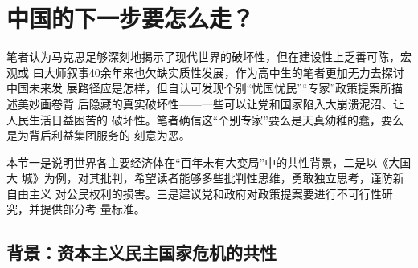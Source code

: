 \chapter{中国的下一步要怎么走？}


笔者认为马克思足够深刻地揭示了现代世界的破坏性，但在建设性上乏善可陈，宏观或
曰大师叙事40余年来也欠缺实质性发展，作为高中生的笔者更加无力去探讨中国未来发
展路径应是怎样，但自认可发现个别“忧国忧民”“专家”政策提案所描述美妙画卷背
后隐藏的真实破坏性——一些可以让党和国家陷入大崩溃泥沼、让人民生活日益困苦的
破坏性。笔者确信这“个别专家”要么是天真幼稚的蠢，要么是为背后利益集团服务的
刻意为恶。

本节一是说明世界各主要经济体在“百年未有大变局”中的共性背景，二是以《大国大
城》为例，对其批判，希望读者能够多些批判性思维，勇敢独立思考，谨防新自由主义
对公民权利的损害。三是建议党和政府对政策提案要进行不可行性研究，并提供部分考
量标准。


\section{背景：资本主义民主国家危机的共性}

